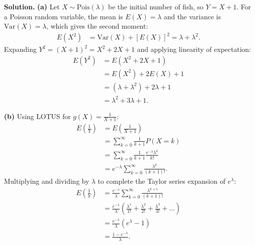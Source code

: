 \documentclass[11pt,a4paper]{article}
\begin{document}
\noindent \textbf{Solution.} \textbf{(a)} Let $X \sim \text{Pois}(\lambda)$ be the initial number of fish, so $Y = X + 1$. For a Poisson random variable, the mean is $E(X) = \lambda$ and the variance is $\text{Var}(X) = \lambda$, which gives the second moment:
\begin{align*}
E(X^2) &= \text{Var}(X) + [E(X)]^2 = \lambda + \lambda^2.
\end{align*}
Expanding $Y^2 = (X + 1)^2 = X^2 + 2X + 1$ and applying linearity of expectation:
\begin{align*}
E(Y^2) &= E\left(X^2 + 2X + 1\right) \\
&= E(X^2) + 2 E(X) + 1 \\
&= (\lambda + \lambda^2) + 2\lambda + 1 \\
&= \lambda^2 + 3\lambda + 1.
\end{align*}

\vspace{4pt}
\noindent \textbf{(b)} Using LOTUS for $g(X) = \frac{1}{X+1}$:
\begin{align*}
E\left(\frac{1}{Y}\right) &= E\left(\frac{1}{X + 1}\right) \\
&= \sum_{k=0}^{\infty} \frac{1}{k + 1} P(X = k) \\
&= \sum_{k=0}^{\infty} \frac{1}{k + 1} \frac{e^{-\lambda} \lambda^k}{k!} \\
&= e^{-\lambda} \sum_{k=0}^{\infty} \frac{\lambda^k}{(k + 1)!}.
\end{align*}
Multiplying and dividing by $\lambda$ to complete the Taylor series expansion of $e^\lambda$:
\begin{align*}
E\left(\frac{1}{Y}\right) &= \frac{e^{-\lambda}}{\lambda} \sum_{k=0}^{\infty} \frac{\lambda^{k+1}}{(k + 1)!} \\
&= \frac{e^{-\lambda}}{\lambda} \left( \frac{\lambda^1}{1!} + \frac{\lambda^2}{2!} + \frac{\lambda^3}{3!} + \dots \right) \\
&= \frac{e^{-\lambda}}{\lambda} \left( e^\lambda - 1 \right) \\
&= \frac{1 - e^{-\lambda}}{\lambda}.
\end{align*}

\vspace{10pt}
\end{document}
